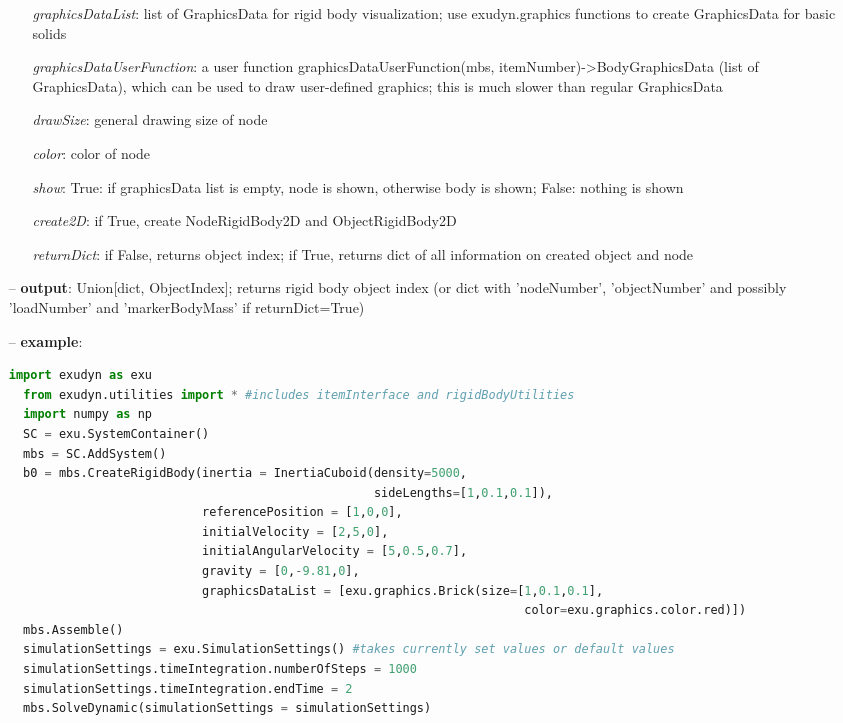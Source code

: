 \begin{itemize}[leftmargin=0.7cm]
\begin{itemize}[leftmargin=1.2cm]
\item[]{\it graphicsDataList}: list of GraphicsData for rigid body visualization; use exudyn.graphics functions to create GraphicsData for basic solids
\item[]{\it graphicsDataUserFunction}: a user function graphicsDataUserFunction(mbs, itemNumber)->BodyGraphicsData (list of GraphicsData), which can be used to draw user-defined graphics; this is much slower than regular GraphicsData
\item[]{\it drawSize}: general drawing size of node
\item[]{\it color}: color of node
\item[]{\it show}: True: if graphicsData list is empty, node is shown, otherwise body is shown; False: nothing is shown
\item[]{\it create2D}: if True, create NodeRigidBody2D and ObjectRigidBody2D
\item[]{\it returnDict}: if False, returns object index; if True, returns dict of all information on created object and node
\end{itemize}
\item[--]
{\bf output}: Union[dict, ObjectIndex]; returns rigid body object index (or dict with 'nodeNumber', 'objectNumber' and possibly 'loadNumber' and 'markerBodyMass' if returnDict=True)
\item[--]
{\bf example}: \vspace{-12pt}\ei\begin{lstlisting}[language=Python, xleftmargin=36pt]
  import exudyn as exu
  from exudyn.utilities import * #includes itemInterface and rigidBodyUtilities
  import numpy as np
  SC = exu.SystemContainer()
  mbs = SC.AddSystem()
  b0 = mbs.CreateRigidBody(inertia = InertiaCuboid(density=5000,
                                                   sideLengths=[1,0.1,0.1]),
                           referencePosition = [1,0,0],
                           initialVelocity = [2,5,0],
                           initialAngularVelocity = [5,0.5,0.7],
                           gravity = [0,-9.81,0],
                           graphicsDataList = [exu.graphics.Brick(size=[1,0.1,0.1],
                                                                        color=exu.graphics.color.red)])
  mbs.Assemble()
  simulationSettings = exu.SimulationSettings() #takes currently set values or default values
  simulationSettings.timeIntegration.numberOfSteps = 1000
  simulationSettings.timeIntegration.endTime = 2
  mbs.SolveDynamic(simulationSettings = simulationSettings)
\end{lstlisting}\vspace{-24pt}\bi\item[]\vspace{-24pt}\vspace{12pt}\end{itemize}
%

